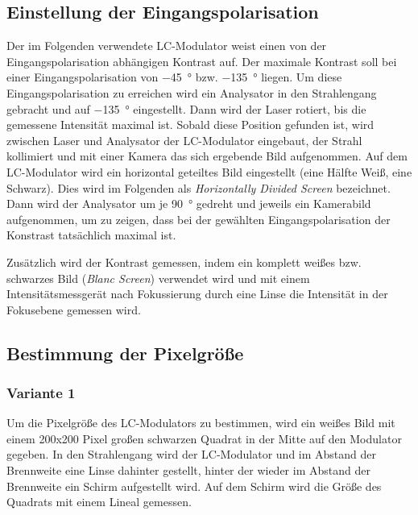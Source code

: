 \documentclass[
	a4paper,
	12pt,
	pagesize,
	ngerman
]{scrartcl}
\begin{document}
	\subsection{Einstellung der Eingangspolarisation}
	Der im Folgenden verwendete LC-Modulator weist einen von der Eingangspolarisation abhängigen Kontrast auf.
	Der maximale Kontrast soll bei einer Eingangspolarisation von \SI{-45}{\degree} bzw. \SI{-135}{\degree} liegen.
	Um diese Eingangspolarisation zu erreichen wird ein Analysator in den Strahlengang gebracht und auf \SI{-135}{\degree} eingestellt.
	Dann wird der Laser rotiert, bis die gemessene Intensität maximal ist.
	Sobald diese Position gefunden ist, wird zwischen Laser und Analysator der LC-Modulator eingebaut, der Strahl kollimiert und mit einer Kamera das sich ergebende Bild aufgenommen.
	Auf dem LC-Modulator wird ein horizontal geteiltes Bild eingestellt (eine Hälfte Weiß, eine Schwarz).
	Dies wird im Folgenden als \textit{Horizontally Divided Screen} bezeichnet.
	Dann wird der Analysator um je \SI{90}{\degree} gedreht und jeweils ein Kamerabild aufgenommen, um zu zeigen, dass bei der gewählten Eingangspolarisation der Konstrast tatsächlich maximal ist. %

	Zusätzlich wird der Kontrast gemessen, indem ein komplett weißes bzw. schwarzes Bild (\textit{Blanc Screen}) verwendet wird und mit einem Intensitätsmessgerät nach Fokussierung durch eine Linse die Intensität in der Fokusebene gemessen wird.

	\subsection{Bestimmung der Pixelgröße}
		\subsubsection*{Variante 1}
		Um die Pixelgröße des LC-Modulators zu bestimmen, wird ein weißes Bild mit einem 200x200 Pixel großen schwarzen Quadrat in der Mitte auf den Modulator gegeben.
		In den Strahlengang wird der LC-Modulator und im Abstand der Brennweite eine Linse dahinter gestellt, hinter der wieder im Abstand der Brennweite ein Schirm aufgestellt wird.
		Auf dem Schirm wird die Größe des Quadrats mit einem Lineal gemessen. %
\end{document}

